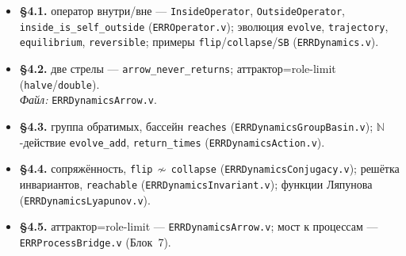 \documentclass[12pt,a4paper]{article}
\begin{document}
\begin{itemize}\itemsep2pt
\item \textbf{§4.1.} оператор внутри/вне --- \texttt{InsideOperator}, \texttt{OutsideOperator},
\texttt{inside\_is\_self\_outside} (\texttt{ERROperator.v}); эволюция \texttt{evolve},
\texttt{trajectory}, \texttt{equilibrium}, \texttt{reversible}; примеры \texttt{flip}/\texttt{collapse}/\texttt{SB}
(\texttt{ERRDynamics.v}).

\item \textbf{§4.2.} две стрелы --- \texttt{arrow\_never\_returns}; аттрактор=role-limit
(\texttt{halve}/\texttt{double}).\\
\emph{Файл:} \texttt{ERRDynamicsArrow.v}.

\item \textbf{§4.3.} группа обратимых, бассейн \texttt{reaches} (\texttt{ERRDynamicsGroupBasin.v});
$\mathbb{N}$-действие \texttt{evolve\_add}, \texttt{return\_times} (\texttt{ERRDynamicsAction.v}).

\item \textbf{§4.4.} сопряжённость, \texttt{flip}$\,\not\sim\,$\texttt{collapse}
(\texttt{ERRDynamicsConjugacy.v}); решётка инвариантов, \texttt{reachable}
(\texttt{ERRDynamicsInvariant.v}); функции Ляпунова (\texttt{ERRDynamicsLyapunov.v}).

\item \textbf{§4.5.} аттрактор=role-limit --- \texttt{ERRDynamicsArrow.v}; мост к процессам ---
\texttt{ERRProcessBridge.v} (Блок~7).
\end{itemize}
\normalsize

\end{document}
